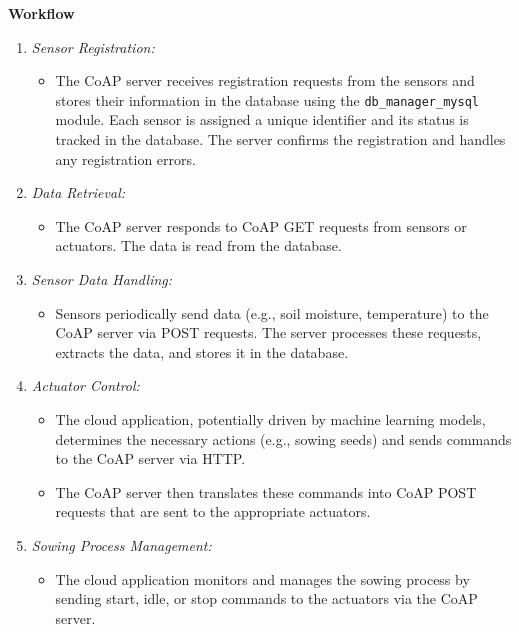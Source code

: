 \textbf{Workflow}
\begin{enumerate}
    \item \textit{Sensor Registration:} 
    \begin{itemize}
        \item The CoAP server receives registration requests from the sensors and stores their information in the database using the \texttt{db\_manager\_mysql} module. Each sensor is assigned a unique identifier and its status is tracked in the database. The server confirms the registration and handles any registration errors.
    \end{itemize}
    
    \item \textit{Data Retrieval:}
    \begin{itemize}
        \item The CoAP server responds to CoAP GET requests from sensors or actuators. The data is read from the database.
    \end{itemize}

    \item \textit{Sensor Data Handling:} 
    \begin{itemize}
        \item Sensors periodically send data (e.g., soil moisture, temperature) to the CoAP server via POST requests. The server processes these requests, extracts the data, and stores it in the database.
    \end{itemize}
    
    \item \textit{Actuator Control:} 
    \begin{itemize}
        \item The cloud application, potentially driven by machine learning models, determines the necessary actions (e.g., sowing seeds) and sends commands to the CoAP server via HTTP.
        \item The CoAP server then translates these commands into CoAP POST requests that are sent to the appropriate actuators. 
    \end{itemize}
    
    \item \textit{Sowing Process Management:} 
    \begin{itemize}
        \item The cloud application monitors and manages the sowing process by sending start, idle, or stop commands to the actuators via the CoAP server. 
    \end{itemize}
    

\end{enumerate}
